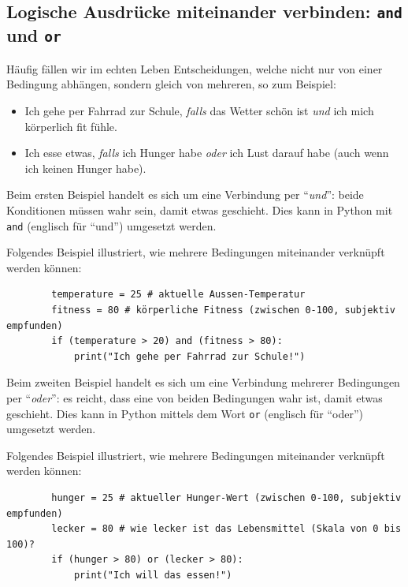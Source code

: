\subsection{Logische Ausdrücke miteinander verbinden: \texorpdfstring{\lstinline|and|}{and} und \texorpdfstring{\lstinline|or|}{or}}



Häufig fällen wir im echten Leben Entscheidungen, welche nicht nur von einer Bedingung abhängen, sondern gleich von mehreren, so zum Beispiel:
\begin{itemize}
	\item Ich gehe per Fahrrad zur Schule, \textit{falls} das Wetter schön ist \textit{und} ich mich körperlich fit fühle.
	\item Ich esse etwas, \textit{falls} ich Hunger habe \textit{oder} ich Lust darauf habe (auch wenn ich keinen Hunger habe).
\end{itemize}
Beim ersten Beispiel handelt es sich um eine Verbindung per \enquote{\textit{und}}: beide Konditionen müssen wahr sein, damit etwas geschieht. Dies kann in Python mit \lstinline|and| (englisch für \enquote{und}) umgesetzt werden.

\begin{myexample}\label{example:fahrrad}
Folgendes Beispiel illustriert, wie mehrere Bedingungen miteinander verknüpft werden können:
\begin{lstlisting}
		temperature = 25 # aktuelle Aussen-Temperatur
		fitness = 80 # körperliche Fitness (zwischen 0-100, subjektiv empfunden)
		if (temperature > 20) and (fitness > 80):
			print("Ich gehe per Fahrrad zur Schule!")
	\end{lstlisting}
\end{myexample}

Beim zweiten Beispiel handelt es sich um eine Verbindung mehrerer Bedingungen per \enquote{\textit{oder}}: es reicht, dass eine von beiden Bedingungen wahr ist, damit etwas geschieht. Dies kann in Python mittels dem Wort \lstinline|or| (englisch für \enquote{oder}) umgesetzt werden.
\begin{myexample}
Folgendes Beispiel illustriert, wie mehrere Bedingungen miteinander verknüpft werden können:
\begin{lstlisting}
		hunger = 25 # aktueller Hunger-Wert (zwischen 0-100, subjektiv empfunden)
		lecker = 80 # wie lecker ist das Lebensmittel (Skala von 0 bis 100)?
		if (hunger > 80) or (lecker > 80):
			print("Ich will das essen!")
	\end{lstlisting}
\end{myexample}

